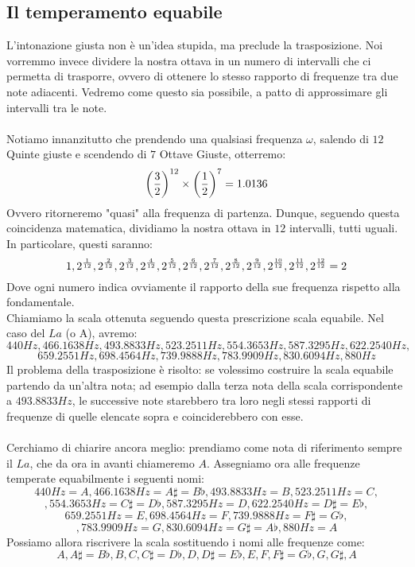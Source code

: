 \documentclass[12pt,a4paper]{report}
\theoremstyle{definition}
\theoremstyle{Theorem}
\theoremstyle{definition}
\theoremstyle{definition}
\theoremstyle{definition}
\begin{document}
	 \subsection{Il temperamento equabile}
	 L'intonazione giusta non è un'idea stupida, ma preclude la trasposizione. Noi vorremmo invece dividere la nostra ottava in un numero di intervalli che ci permetta di trasporre, ovvero di ottenere lo stesso rapporto di frequenze tra due note adiacenti. Vedremo come questo sia possibile, a patto di approssimare gli intervalli tra le note.\\
	 \\
	 Notiamo innanzitutto che prendendo una qualsiasi frequenza $\omega$, salendo di $12$ Quinte giuste e scendendo di $7$ Ottave Giuste, otterremo:
	 $$\bigg({3\over 2}\bigg)^{12}\times \bigg({1\over 2}\bigg)^7=1.0136$$
	 Ovvero ritorneremo "quasi" alla frequenza di partenza. Dunque, seguendo questa coincidenza matematica, dividiamo la nostra ottava in $12$ intervalli, tutti uguali. In particolare, questi saranno:
	 $$1,2^{1\over12},2^{2\over12},2^{3\over12},2^{4\over12},2^{5\over12},2^{6\over12},2^{7\over12},2^{8\over12},2^{9\over12},2^{10\over12},2^{11\over12},2^{12\over12}=2$$
	 Dove ogni numero indica ovviamente il rapporto della sue frequenza rispetto alla fondamentale.\\
	 Chiamiamo la scala ottenuta seguendo questa prescrizione scala equabile.
	 Nel caso del $La$ (o A), avremo:
	 $$440Hz,466.1638 Hz,493.8833 Hz,523.2511 Hz,554.3653 Hz,587.3295 Hz,622.2540 Hz,$$
	 $$659.2551 Hz,698.4564 Hz,739.9888 Hz,783.9909 Hz,830.6094 Hz,880 Hz$$ 
	 Il problema della trasposizione è risolto: se volessimo costruire la scala equabile partendo da un'altra nota; ad esempio dalla terza nota della scala corrispondente a $493.8833 Hz$, le successive note starebbero tra loro negli stessi rapporti di frequenze di quelle elencate sopra e coinciderebbero con esse.\\
	 \\
	 Cerchiamo di chiarire ancora meglio: prendiamo come nota di riferimento sempre il $La$, che da ora in avanti chiameremo $A$. Assegniamo ora alle frequenze temperate equabilmente i seguenti nomi:
	  $$440Hz=A,466.1638 Hz=A\sharp=B\flat,493.8833 Hz=B,523.2511 Hz=C,$$
	  $$,554.3653 Hz=C\sharp=D\flat,587.3295 Hz=D,622.2540 Hz=D\sharp=E\flat,$$
	 $$659.2551 Hz=E,698.4564 Hz=F,739.9888 Hz=F\sharp=G\flat,$$
	 $$,783.9909 Hz=G,830.6094 Hz=G\sharp=A\flat,880 Hz=A$$
	 Possiamo allora riscrivere la scala sostituendo i nomi alle frequenze come:
	 $$A,A\sharp=B\flat,B,C,C\sharp=D\flat,D,D\sharp=E\flat,E,F,F\sharp=G\flat,G,G\sharp,A$$
\end{document}
